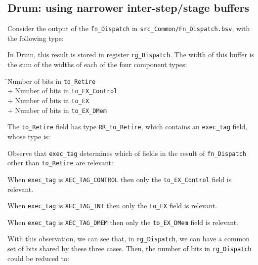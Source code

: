 
\subsection{Drum: using narrower inter-step/stage buffers}

Consider the output of the \verb|fn_Dispatch| in
\verb|src_Common/Fn_Dispatch.bsv|, with the following type:



In Drum, this result is stored in register \verb|rg_Dispatch|.  The
width of this buffer is the sum of the widths of each of the four
component types:

\begin{tabbing}
\hmm \= \hmm \= Number of bits in {\tt to\_Retire} \\
     \> $+$  \> Number of bits in {\tt to\_EX\_Control} \\
     \> $+$  \> Number of bits in {\tt to\_EX} \\
     \> $+$  \> Number of bits in {\tt to\_EX\_DMem}
\end{tabbing}

The \verb|to_Retire| field has type \verb|RR_to_Retire|, which
contains an \verb|exec_tag| field, whose type is:



Observe that \verb|exec_tag| determines which of fields in the result
of \verb|fn_Dispatch| other than \verb|to_Retire| are relevant:

\begin{tightlist}

 \item When \verb|exec_tag| is \verb|XEC_TAG_CONTROL| then
       only the \verb|to_EX_Control| field is relevant.

 \item When \verb|exec_tag| is \verb|XEC_TAG_INT| then
       only the \verb|to_EX| field is relevant.

 \item When \verb|exec_tag| is \verb|XEC_TAG_DMEM| then
       only the \verb|to_EX_DMem| field is relevant.

\end{tightlist}

With this observation, we can see that, in \verb|rg_Dispatch|, we can
have a common set of bits shared by these three cases.  Then, the
number of bits in \verb|rg_Dispatch| could be reduced to:

